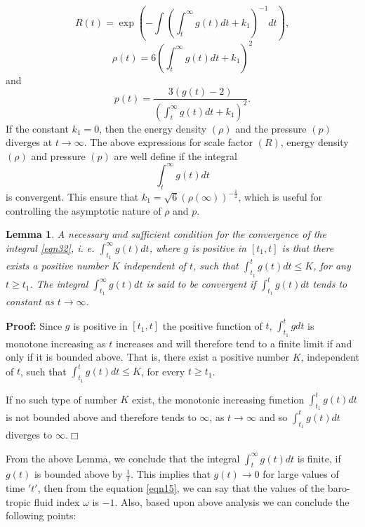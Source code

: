 \documentclass[11pt]{article}
\theoremstyle{theorem}
\newtheorem{lemma}[theorem]{Lemma}
\theoremstyle{defi}
\begin{document}
\begin{equation}
\label{eqn29}
R(t)=\exp\left(-\int\left(\int_{t}^{\infty}g(t)dt+k_1\right)^{-1}dt\right),
\end{equation}
\begin{equation}
\label{eqn30}
\rho (t)=6\left(\int_{t}^{\infty}g(t)dt+k_1\right)^2
\end{equation}
and
\begin{equation}
\label{eqn31}
p(t)=\frac{3(g(t)-2)}{\left(\int_{t}^{\infty}g(t)dt+k_1\right)^2}.
\end{equation}
If the constant $k_1=0$, then the energy density $(\rho)$ and the pressure $(p)$ diverges at $t\to\infty$. The above expressions for scale factor $(R)$, energy density $(\rho)$ and pressure $(p)$ are well define if the integral
\begin{equation}
\label{eqn32}
\int_{t}^{\infty}g(t)dt
\end{equation}
is convergent. This ensure that $k_1=\sqrt6 (\rho(\infty))^{-\frac{1}{2}}$, which is useful for controlling the asymptotic nature of $\rho$ and $p$.
\begin{lemma}
A necessary and sufficient condition for the convergence of the integral \eqref{eqn32}, i. e. $\int_{t_1}^{\infty}g(t)dt$, where $g$ is positive in $[t_1, t]$
is that there exists a positive number $K$ independent of $t$, such that $\int_{t_1}^{t}g(t)dt\leq K$, for any $t\ge t_1$. The integral
$\int_{t_1}^{\infty}g(t)dt$ is said to be convergent if $\int_{t_1}^{t}g(t)dt$ tends to constant as $t\rightarrow\infty$.
\end{lemma}
\textbf{Proof:} Since $g$ is positive in $[t_1, t]$ the positive function of $t$, $\int_{t_1}^{t}gdt$ is monotone increasing as $t$ increases
and will therefore tend to a finite limit if and only if it is bounded above. That is, there exist a positive number $K$, independent of $t$,
 such that $\int_{t_1}^{t}g(t)dt\leq K$, for every $t\ge t_1$. \par
 If no such type of number $K$ exist, the monotonic increasing function $\int_{t_1}^{t}g(t)dt$ is not bounded above and therefore tends to $\infty$,
 as $t\rightarrow\infty$ and so $\int_{t_1}^{t}g(t)dt$ diverges to $\infty$.\hfill $\Box$
 \par
 From the above Lemma, we conclude that the integral $\int_{t}^{\infty}g(t)dt$ is finite, if $g(t)$ is bounded above by $\frac{1}{t}$. This implies
 that $g(t)\rightarrow 0$ for large values of time $'t'$, then from the equation \eqref{eqn15}, we can say that the values of the baro-tropic fluid index $\omega$ is $-1$. Also, based upon above analysis we can conclude the following points:
\end{document}
